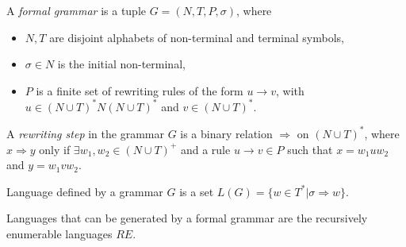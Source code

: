 \begin{definition}
A {\em formal grammar} is a tuple $G = (N,T,P,\sigma)$, where
\begin{itemize}
  \item $N, T$ are disjoint alphabets of non-terminal and terminal symbols,
  \item $\sigma\in N$ is the initial non-terminal,
  \item $P$ is a finite set of rewriting rules of the form $u\rightarrow v$, with $u\in (N\cup T)^*N(N\cup T)^*$ and $v\in (N\cup T)^*$.
\end{itemize}
\end{definition}

\begin{definition}
A {\em rewriting step} in the grammar $G$ is a binary relation $\Rightarrow$ on $(N\cup T)^*$, where $x\Rightarrow y$ only if $\exists w_1, w_2\in (N\cup T)^+$ and a rule $u\rightarrow v \in P$ such that $x=w_1uw_2$ and $y=w_1vw_2$.
\end{definition}

\begin{definition}
Language defined by a grammar $G$ is a set $L(G)=\{w\in T^*|\sigma\Rightarrow w\}$.
\end{definition}

Languages that can be generated by a formal grammar are the recursively enumerable languages $RE$.
